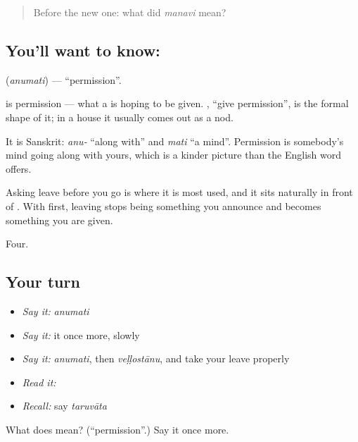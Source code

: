 \label{lesson:TE-C65-permission}



\begin{quote}
Before the new one: what did \emph{manavi} mean?
\end{quote}

\subsection*{You'll want to know: }
\textbf{} (\emph{anumati}) — \textquotedblleft{}permission\textquotedblright{}.

 is permission — what a  is hoping to be given.  , \textquotedblleft{}give permission\textquotedblright{}, is the formal shape of it; in a house it usually comes out as a nod.

It is Sanskrit: \emph{anu-} \textquotedblleft{}along with\textquotedblright{} and \emph{mati} \textquotedblleft{}a mind\textquotedblright{}. Permission is somebody's mind going along with yours, which is a kinder picture than the English word offers.

Asking leave before you go is where it is most used, and it sits naturally in front of . With  first, leaving stops being something you announce and becomes something you are given.

\begin{grammarlens}[title={What you've built}]
Four.
\end{grammarlens}

\subsection*{Your turn}
\begin{itemize}
\raggedright
  \item \emph{Say it:} \emph{anumati}
  \item \emph{Say it:} it once more, slowly
  \item \emph{Say it:} \emph{anumati}, then \emph{veḷḷostānu}, and take your leave properly
  \item \emph{Read it:} \textbf{}
  \item \emph{Recall:} say \emph{taruvāta}
\end{itemize}

\begin{tcolorbox}[breakable,colback=teal!4,colframe=teal!35!black,title={Before you move on}]
What does  mean? (\textquotedblleft{}permission\textquotedblright{}.) Say it once more.
\end{tcolorbox}
